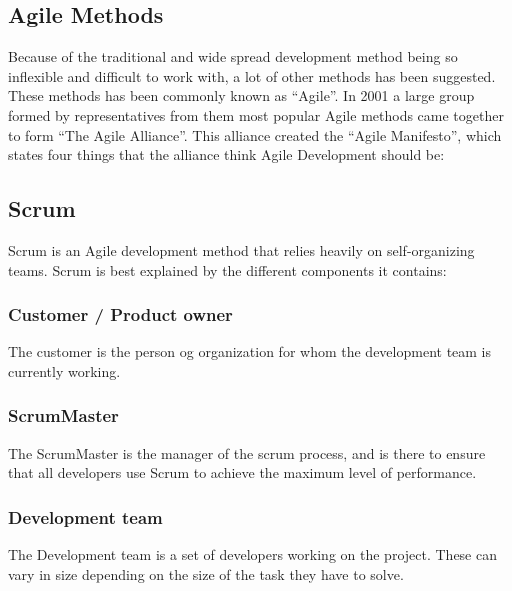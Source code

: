 \subsection{Agile Methods}
Because of the traditional and wide spread development method being so inflexible and difficult to work with, a lot of other methods has been suggested.
These methods has been commonly known as ``Agile''.
In 2001 a large group formed by representatives from them most popular Agile methods came together to form ``The Agile Alliance''.
This alliance created the ``Agile Manifesto'', which states four things that the alliance think Agile Development should be:


\subsection{Scrum}
Scrum is an Agile development method that relies heavily on self-organizing teams. Scrum is best explained by the different components it contains:

\subsubsection{Customer / Product owner}
The customer is the person og organization for whom the development team is currently working.

\subsubsection{ScrumMaster}
The ScrumMaster is the manager of the scrum process, and is there to ensure that all developers use Scrum to achieve the maximum level of performance.

\subsubsection{Development team}
The Development team is a set of developers working on the project. These can vary in size depending on the size of the task they have to solve.

